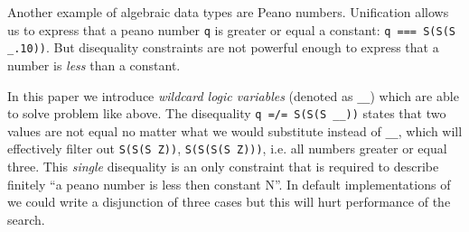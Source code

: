 Another example of algebraic data types are Peano numbers. Unification allows us to express that a peano number \lstinline|q| is greater or equal a constant: \lstinline|q === S(S(S _.10))|$\!\!$.
But disequality constraints are not powerful enough to express that a number is \emph{less} than a constant.

In this paper we introduce \emph{wildcard logic variables
} (denoted as \lstinline|__|) which are able to solve problem like above.
The disequality \lstinline|q =/= S(S(S __))| states that two values are not equal no matter what we would substitute instead of \lstinline|__|, which will effectively filter out \lstinline|S(S(S Z))|, \lstinline|S(S(S(S Z)))|, i.e. all numbers greater or equal three. This \emph{single} disequality is an only constraint that is required  to describe  finitely ``a peano number is less then constant N''.
In default implementations of \miniKanren{} we could write a disjunction of three cases but this will hurt performance of the search.


